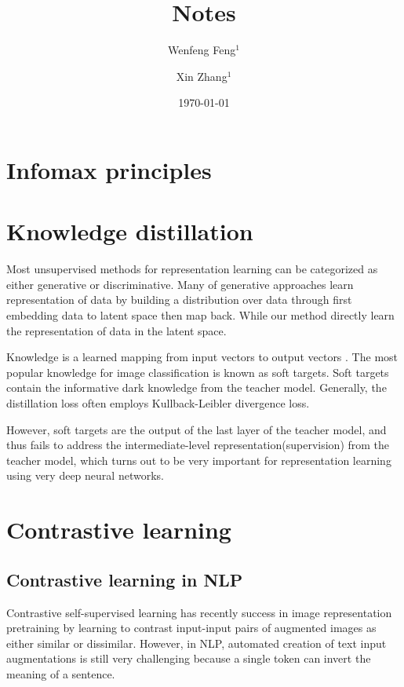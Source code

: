 \documentclass[a4paper]{article}
\title{
	Notes
	}
\author{Wenfeng Feng$^1$ \and Xin Zhang$^1$}
\date{
	\today
}
\begin{document}
	\maketitle
	

	\tableofcontents
	
	\section{Infomax principles}

	\section{Knowledge distillation}
	Most unsupervised methods for representation learning can be categorized as either generative or discriminative.
	Many of generative approaches learn representation of data by building a distribution over data through first embedding data to latent space then map back.
	While our method directly learn the representation of data in the latent space.

	Knowledge is a learned mapping from input vectors to output vectors \cite{hinton2015distilling} .
	The most popular knowledge for image classification is known as soft targets. 
	Soft targets contain the informative dark knowledge from the teacher model.
	Generally, the distillation loss often employs Kullback-Leibler divergence loss.

	However, soft targets are the output of the last layer of the teacher model, and thus fails to address the intermediate-level representation(supervision) from the teacher model, which turns out to be very important for representation learning using very deep neural networks.
	
	\section{Contrastive learning}
	\subsection{Contrastive learning in NLP}
	\cite{rethmeier2021primer}
	Contrastive self-supervised learning has recently success in image representation pretraining by learning to contrast input-input pairs of augmented images as either similar or dissimilar.
	However, in NLP, automated creation of text input augmentations is still very challenging because a single token can invert the meaning of a sentence.
	
\end{document}
